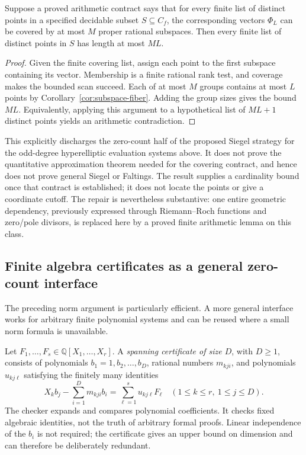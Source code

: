 \begin{corollary}
\label{cor:hyperelliptic-cardinality}
Suppose a proved arithmetic contract says that for every finite list
of distinct points in a specified decidable subset $S\subseteq C_f$,
the corresponding vectors $\Phi_L$ can be covered by at most $M$ proper
rational subspaces.  Then every finite list of distinct points in $S$
has length at most $ML$.
\end{corollary}

\begin{proof}
Given the finite covering list, assign each point to the first subspace
containing its vector.  Membership is a finite rational rank test, and
coverage makes the bounded scan succeed.  Each of at most $M$ groups
contains at most $L$ points by Corollary~\ref{cor:subspace-fiber}.
Adding the group sizes gives the bound $ML$.  Equivalently, applying
this argument to a hypothetical list of $ML+1$ distinct points yields
an arithmetic contradiction.
\end{proof}

This explicitly discharges the zero-count half of the proposed Siegel
strategy for the odd-degree hyperelliptic evaluation systems above.
It does not prove the quantitative approximation theorem needed for the
covering contract, and hence does not prove general Siegel or Faltings.
The result supplies a cardinality bound once that contract is established;
it does not locate the points or give a coordinate cutoff.  The repair is
nevertheless substantive: one entire geometric dependency, previously
expressed through Riemann--Roch functions and zero/pole divisors, is
replaced here by a proved finite arithmetic lemma on this class.

\subsection{Finite algebra certificates as a general zero-count interface}

The preceding norm argument is particularly efficient.  A more general
interface works for arbitrary finite polynomial systems and can be reused
where a small norm formula is unavailable.

Let $F_1,\ldots,F_s\in\mathbb Q[X_1,\ldots,X_r]$.  A
\emph{spanning certificate of size $D$}, with $D\ge1$, consists of
polynomials $b_1=1,b_2,\ldots,b_D$, rational numbers $m_{kji}$, and
polynomials $u_{kj\ell}$ satisfying the finitely many identities
\[
 X_k b_j-\sum_{i=1}^D m_{kji}b_i
       =\sum_{\ell=1}^s u_{kj\ell}F_\ell
 \quad(1\le k\le r,\ 1\le j\le D).
 \label{eq:spanning-certificate}
\]
The checker expands and compares polynomial coefficients.  It checks
fixed algebraic identities, not the truth of arbitrary formal proofs.
Linear independence of the $b_i$ is not required; the certificate gives
an upper bound on dimension and can therefore be deliberately redundant.

